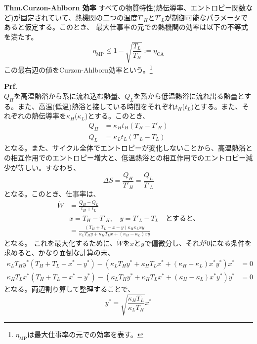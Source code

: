 \documentclass[a4paper,11pt]{jsarticle}
\numberwithin{equation}{section}
\begin{document}
\begin{itembox}[l]{\textbf{Thm.Curzon-Ahlborn 効率}}
  すべての物質特性(熱伝導率、エントロピー関数など)が固定されていて、熱機関の二つの温度$T'_H$と$T'_L$が制御可能なパラメータであると仮定する。このとき、
  最大仕事率の元での熱機関の効率は以下の不等式を満たす。
  \begin{equation}
    \eta_{\text{MP}} \leq 1 - \sqrt{\frac{T_L}{T_H}} := \eta_{\text{CA}}
  \end{equation}
  この最右辺の値をCurzon-Ahlborn効率という。\footnote{$\eta_{\text{MP}}$は最大仕事率の元での効率を表す。}
\end{itembox}
\textbf{Prf.}\\
$Q_{H}$を高温熱浴から系に流れ込む熱量、$Q_{L}$を系から低温熱浴に流れ出る熱量とする。また、高温(低温)熱浴と接している時間をそれぞれ$t_{H}$($t_{L}$)とする。また、それぞれの熱伝導率を$\kappa_{H}$($\kappa_{L}$)とする。このとき、
\begin{align}
  Q_{H} &= \kappa_{H}t_{H}(T_{H}-T'_{H})\\
  Q_{L} &= \kappa_{L}t_{L}(T'_{L}-T_{L})
\end{align}
となる。また、サイクル全体でエントロピーが変化しないことから、高温熱浴との相互作用でのエントロピー増大と、低温熱浴との相互作用でのエントロピー減少が等しい。すなわち、
\begin{equation}
  \Delta S = \frac{Q_{H}}{T'_{H}} = \frac{Q_{L}}{T'_{L}}
\end{equation}
となる。このとき、仕事率は、
\begin{align}
  \dot{W} &= \frac{Q_{H} - Q_{L}}{t_{H} + t_{L}}\\
  & x = T_{H} - T'_{H},\quad y = T'_{L} - T_{L} \quad \text{とすると、}\\
  &= \frac{(T_H + T_L - x - y)\kappa_H \kappa_L xy}{\kappa_L T_H y + \kappa_H T_L x + (\kappa_H - \kappa_L) xy}
\end{align}
となる。%
これを最大化するために、$\dot{W}$を$x$と$y$で偏微分し、それが0になる条件を求めると、かなり面倒な計算の末、
\begin{align}
  \kappa_L T_H y^*(T_H + T_L - x^* - y^*) - (\kappa_L T_H y^* + \kappa_H T_L x^* + (\kappa_H - \kappa_L) x^* y^*) x^* &= 0\\
  \kappa_H T_L x^*(T_H + T_L - x^* - y^*) - (\kappa_L T_H y^* + \kappa_H T_L x^* + (\kappa_H - \kappa_L) x^* y^*) y^* &= 0
\end{align}
となる。両辺割り算して整理することで、
\begin{equation}
  y^* = \sqrt{\frac{\kappa_H T_L}{\kappa_L T_H}}x^*
\end{equation}
\end{document}
